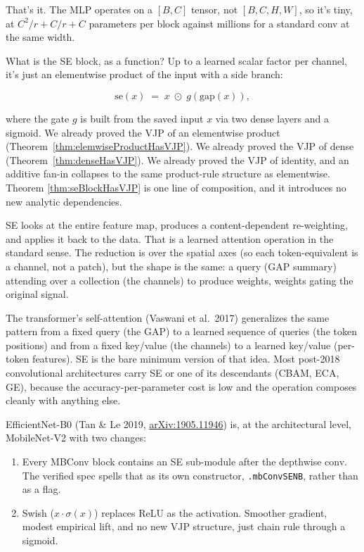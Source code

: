 That's it. The MLP operates on a \([B, C]\) tensor, not
\([B, C, H, W]\), so it's tiny, at \(C^2 / r + C/r + C\) parameters
per block against millions for a standard conv at the same width.


What is the SE block, as a function? Up to a learned scalar
factor per channel, it's just an elementwise product of
the input with a side branch:

\[
\mathrm{se}(x) \;=\; x \;\odot\; g(\mathrm{gap}(x)),
\]

where the gate \(g\) is built from the saved input \(x\) via two
dense layers and a sigmoid. We already proved the VJP of an
elementwise product (Theorem~\ref{thm:elemwiseProductHasVJP}). We already
proved the VJP of dense (Theorem~\ref{thm:denseHasVJP}). We already
proved the VJP of identity, and an additive fan-in collapses to
the same product-rule structure as elementwise. Theorem
\ref{thm:seBlockHasVJP} is one line of composition, and it
introduces no new analytic dependencies.


SE looks at the entire feature map, produces a content-dependent
re-weighting, and applies it back to the data. That is a learned attention
operation in the standard sense. The reduction is over the spatial
axes (so each token-equivalent is a channel, not a patch), but the
shape is the same: a query (GAP summary) attending over a
collection (the channels) to produce weights, weights gating the
original signal.

The transformer's self-attention (Vaswani et al.\ 2017) generalizes
the same pattern from a fixed query (the GAP) to a learned
sequence of queries (the token positions) and from a fixed
key/value (the channels) to a learned key/value (per-token
features). SE is the bare minimum version of that idea. Most
post-2018 convolutional architectures carry SE or one of its descendants
(CBAM, ECA, GE), because the accuracy-per-parameter
cost is low and the operation composes cleanly with anything
else.


EfficientNet-B0 (Tan \& Le 2019,
\href{https://arxiv.org/abs/1905.11946}{arXiv:1905.11946}) is, at
the architectural level, MobileNet-V2 with two changes:

\begin{enumerate}
\item Every MBConv block contains an SE sub-module after
  the depthwise conv. The verified spec spells that as its own
  constructor, \texttt{.mbConvSENB}, rather than as a flag.
\item Swish (\(x \cdot \sigma(x)\)) replaces ReLU as the activation.
  Smoother gradient, modest empirical lift, and no new VJP structure,
  just chain rule through a sigmoid.
\end{enumerate}

